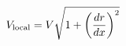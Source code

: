 \documentclass[preview]{standalone}
\begin{document}
\begin{align*}
\special{dvisvgm:raw <g id='unique000'>}V_{\text{local}} = V\sqrt{1 + \left(\frac{dr}{dx}\right)^2}\special{dvisvgm:raw </g>}
\end{align*}
\end{document}

